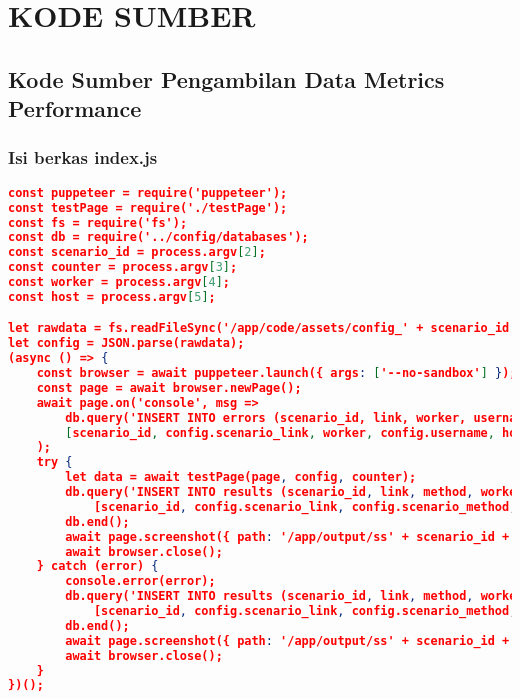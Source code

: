\chapter{KODE SUMBER}

\section*{Kode Sumber Pengambilan Data Metrics Performance} \label{puppeteer}
	\subsection*{Isi berkas index.js}
\begin{lstlisting}[frame=single,tabsize=2,breaklines,caption={Isi berkas index.js},label=indexjs, captionpos=b, language=json]
const puppeteer = require('puppeteer');
const testPage = require('./testPage');
const fs = require('fs');
const db = require('../config/databases');
const scenario_id = process.argv[2];
const counter = process.argv[3];
const worker = process.argv[4];
const host = process.argv[5];

let rawdata = fs.readFileSync('/app/code/assets/config_' + scenario_id + '.json');
let config = JSON.parse(rawdata);
(async () => {
	const browser = await puppeteer.launch({ args: ['--no-sandbox'] });
	const page = await browser.newPage();
	await page.on('console', msg =>
		db.query('INSERT INTO errors (scenario_id, link, worker, username, host, type, text, location_url) VALUES (?, ?, ?, ?, ?, ?, ?, ?)',
		[scenario_id, config.scenario_link, worker, config.username, host, msg._type, msg._text, msg._location.url])
	);
	try {
		let data = await testPage(page, config, counter);
		db.query('INSERT INTO results (scenario_id, link, method, worker, username, host, response_end, dom_content_load, load_event_end, css_trace_end, first_meaningful) VALUES (?, ?, ?, ?, ?, ?, ?, ?, ?, ?, ?)',
			[scenario_id, config.scenario_link, config.scenario_method, worker, config.username, host, data.Timing.responseEnd, data.Timing.domContentLoadedEventEnd, data.Timing.loadEventEnd, data.TraceResult.cssEnd, data.Metrics.FirstMeaningfulPaint]);
		db.end();
		await page.screenshot({ path: '/app/output/ss' + scenario_id + '.png' });
		await browser.close();
	} catch (error) {
		console.error(error);
		db.query('INSERT INTO results (scenario_id, link, method, worker, username, host, response_end, dom_content_load, load_event_end, css_trace_end, first_meaningful) VALUES (?, ?, ?, ?, ?, ?, ?, ?, ?, ?, ?)',
			[scenario_id, config.scenario_link, config.scenario_method, worker, config.username, host, -1, -1, -1, -1, -1]);
		db.end();
		await page.screenshot({ path: '/app/output/ss' + scenario_id + '.png' });
		await browser.close();
	}
})();
\end{lstlisting}

